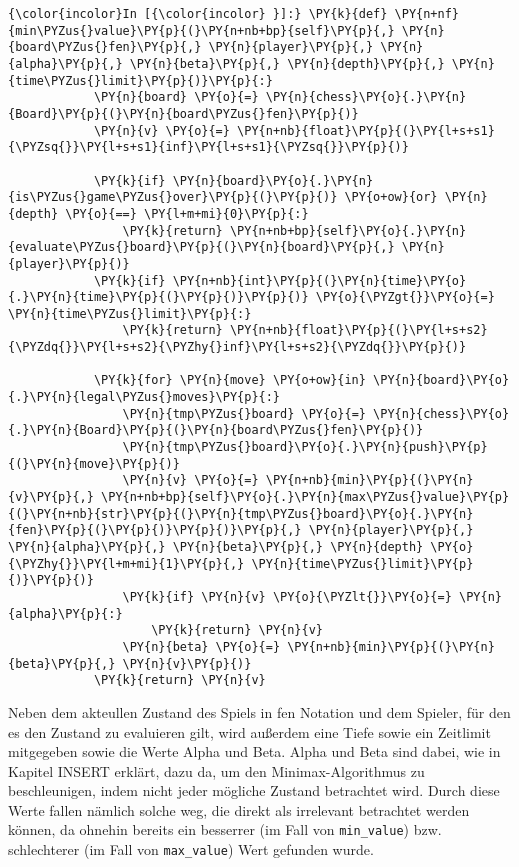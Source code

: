     \begin{Verbatim}[commandchars=\\\{\}]
{\color{incolor}In [{\color{incolor} }]:} \PY{k}{def} \PY{n+nf}{min\PYZus{}value}\PY{p}{(}\PY{n+nb+bp}{self}\PY{p}{,} \PY{n}{board\PYZus{}fen}\PY{p}{,} \PY{n}{player}\PY{p}{,} \PY{n}{alpha}\PY{p}{,} \PY{n}{beta}\PY{p}{,} \PY{n}{depth}\PY{p}{,} \PY{n}{time\PYZus{}limit}\PY{p}{)}\PY{p}{:}
            \PY{n}{board} \PY{o}{=} \PY{n}{chess}\PY{o}{.}\PY{n}{Board}\PY{p}{(}\PY{n}{board\PYZus{}fen}\PY{p}{)}
            \PY{n}{v} \PY{o}{=} \PY{n+nb}{float}\PY{p}{(}\PY{l+s+s1}{\PYZsq{}}\PY{l+s+s1}{inf}\PY{l+s+s1}{\PYZsq{}}\PY{p}{)}
        
            \PY{k}{if} \PY{n}{board}\PY{o}{.}\PY{n}{is\PYZus{}game\PYZus{}over}\PY{p}{(}\PY{p}{)} \PY{o+ow}{or} \PY{n}{depth} \PY{o}{==} \PY{l+m+mi}{0}\PY{p}{:}
                \PY{k}{return} \PY{n+nb+bp}{self}\PY{o}{.}\PY{n}{evaluate\PYZus{}board}\PY{p}{(}\PY{n}{board}\PY{p}{,} \PY{n}{player}\PY{p}{)}
            \PY{k}{if} \PY{n+nb}{int}\PY{p}{(}\PY{n}{time}\PY{o}{.}\PY{n}{time}\PY{p}{(}\PY{p}{)}\PY{p}{)} \PY{o}{\PYZgt{}}\PY{o}{=} \PY{n}{time\PYZus{}limit}\PY{p}{:}
                \PY{k}{return} \PY{n+nb}{float}\PY{p}{(}\PY{l+s+s2}{\PYZdq{}}\PY{l+s+s2}{\PYZhy{}inf}\PY{l+s+s2}{\PYZdq{}}\PY{p}{)}
        
            \PY{k}{for} \PY{n}{move} \PY{o+ow}{in} \PY{n}{board}\PY{o}{.}\PY{n}{legal\PYZus{}moves}\PY{p}{:}
                \PY{n}{tmp\PYZus{}board} \PY{o}{=} \PY{n}{chess}\PY{o}{.}\PY{n}{Board}\PY{p}{(}\PY{n}{board\PYZus{}fen}\PY{p}{)}
                \PY{n}{tmp\PYZus{}board}\PY{o}{.}\PY{n}{push}\PY{p}{(}\PY{n}{move}\PY{p}{)}
                \PY{n}{v} \PY{o}{=} \PY{n+nb}{min}\PY{p}{(}\PY{n}{v}\PY{p}{,} \PY{n+nb+bp}{self}\PY{o}{.}\PY{n}{max\PYZus{}value}\PY{p}{(}\PY{n+nb}{str}\PY{p}{(}\PY{n}{tmp\PYZus{}board}\PY{o}{.}\PY{n}{fen}\PY{p}{(}\PY{p}{)}\PY{p}{)}\PY{p}{,} \PY{n}{player}\PY{p}{,} \PY{n}{alpha}\PY{p}{,} \PY{n}{beta}\PY{p}{,} \PY{n}{depth} \PY{o}{\PYZhy{}}\PY{l+m+mi}{1}\PY{p}{,} \PY{n}{time\PYZus{}limit}\PY{p}{)}\PY{p}{)}
                \PY{k}{if} \PY{n}{v} \PY{o}{\PYZlt{}}\PY{o}{=} \PY{n}{alpha}\PY{p}{:}
                    \PY{k}{return} \PY{n}{v}
                \PY{n}{beta} \PY{o}{=} \PY{n+nb}{min}\PY{p}{(}\PY{n}{beta}\PY{p}{,} \PY{n}{v}\PY{p}{)}
            \PY{k}{return} \PY{n}{v}
\end{Verbatim}

    Neben dem akteullen Zustand des Spiels in fen Notation und dem Spieler,
für den es den Zustand zu evaluieren gilt, wird außerdem eine Tiefe
sowie ein Zeitlimit mitgegeben sowie die Werte Alpha und Beta. Alpha und
Beta sind dabei, wie in Kapitel INSERT erklärt, dazu da, um den
Minimax-Algorithmus zu beschleunigen, indem nicht jeder mögliche Zustand
betrachtet wird. Durch diese Werte fallen nämlich solche weg, die direkt
als irrelevant betrachtet werden können, da ohnehin bereits ein
besserrer (im Fall von \texttt{min\_value}) bzw. schlechterer (im Fall
von \texttt{max\_value}) Wert gefunden wurde.

